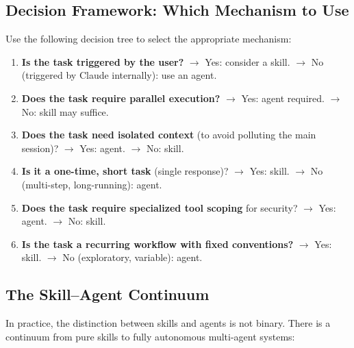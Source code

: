 \documentclass[11pt,letterpaper]{article}
\begin{document}
\subsection{Decision Framework: Which Mechanism to Use}

Use the following decision tree to select the appropriate mechanism:

\begin{enumerate}[leftmargin=*]
    \item \textbf{Is the task triggered by the user?} $\rightarrow$ Yes: consider a skill. $\rightarrow$ No (triggered by Claude internally): use an agent.
    \item \textbf{Does the task require parallel execution?} $\rightarrow$ Yes: agent required. $\rightarrow$ No: skill may suffice.
    \item \textbf{Does the task need isolated context} (to avoid polluting the main session)? $\rightarrow$ Yes: agent. $\rightarrow$ No: skill.
    \item \textbf{Is it a one-time, short task} (single response)? $\rightarrow$ Yes: skill. $\rightarrow$ No (multi-step, long-running): agent.
    \item \textbf{Does the task require specialized tool scoping} for security? $\rightarrow$ Yes: agent. $\rightarrow$ No: skill.
    \item \textbf{Is the task a recurring workflow with fixed conventions?} $\rightarrow$ Yes: skill. $\rightarrow$ No (exploratory, variable): agent.
\end{enumerate}

\subsection{The Skill--Agent Continuum}

In practice, the distinction between skills and agents is not binary. There is a continuum from pure skills to fully autonomous multi-agent systems:
\end{document}
